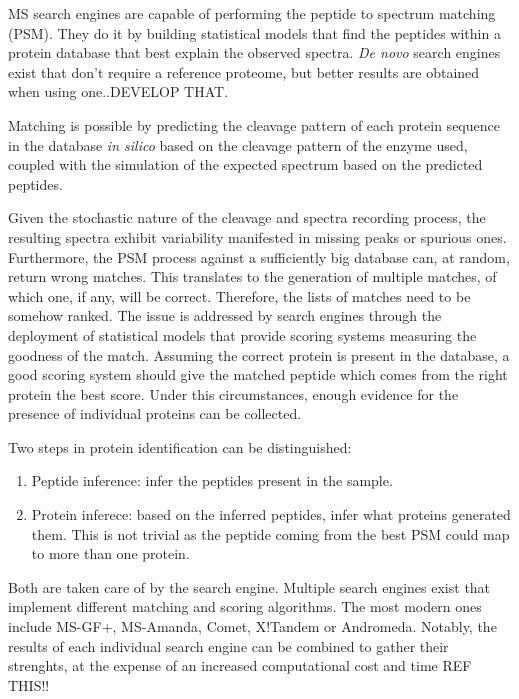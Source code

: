 \documentclass[11pt, a4paper]{report}
\begin{document}
\ac{MS} search engines are capable of performing the peptide to spectrum matching (PSM). They do it by building statistical models that find the peptides within a protein database that best explain the observed spectra. \textit{De novo} search engines exist that don't require a reference proteome, but better results are obtained when using one..DEVELOP THAT.

Matching is possible by predicting the cleavage pattern of each protein sequence in the database \textit{in silico} based on the cleavage pattern of the enzyme used, coupled with the simulation of the expected spectrum based on the predicted peptides.

Given the stochastic nature of the cleavage and spectra recording process, the resulting spectra exhibit variability manifested in missing peaks or spurious ones. Furthermore, the PSM process against a sufficiently big database can, at random, return wrong matches. This translates to the generation of multiple matches, of which one, if any, will be correct. Therefore, the lists of matches need to be somehow ranked. The issue is addressed by search engines through the deployment of statistical models that provide scoring systems measuring the goodness of the match. Assuming the correct protein is present in the database, a good scoring system should give the matched peptide which comes from the right protein the best score. Under this circumstances, enough evidence for the presence of individual proteins can be collected.

Two steps in protein identification can be distinguished:

\begin{enumerate}

\item Peptide inference: infer the peptides present in the sample.
\item Protein inferece: based on the inferred peptides, infer what proteins generated them. This is not trivial as the peptide coming from the best PSM could map to more than one protein.
\end{enumerate}

Both are taken care of by the search engine. Multiple search engines exist that implement different matching and scoring algorithms. The most modern ones include MS-GF+, MS-Amanda, Comet, X!Tandem or Andromeda. Notably, the results of each individual search engine can be combined to gather their strenghts, at the expense of an increased computational cost and time REF THIS!!
\end{document}
